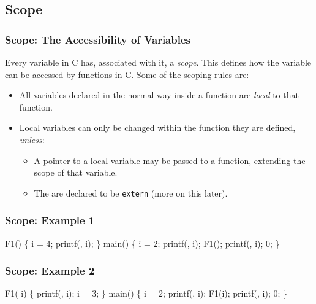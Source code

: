 \documentclass[smaller,table]{beamer} %
\begin{document}
\subsection{Scope}
\begin{frame}
\frametitle{Scope: The Accessibility of Variables}
Every variable in C has, associated with it, a \emph{scope}. This defines how the variable can be accessed by functions in C. Some of the scoping rules are:
\begin{itemize}
\item All variables declared in the normal way inside a function are \emph{local} to that function.
\item Local variables can only be changed within the function they are defined,
\emph{unless}:
\begin{itemize}
\item A pointer to a local variable may be passed to a function, extending the scope of that variable.
\item The are declared to be {\tt extern} (more on this later).
\end{itemize}
\end{itemize}
\end{frame}

\begin{frame}[fragile]
\frametitle{Scope: Example 1}
\vspace{-0.1in}
\begin{semiverbatim}
\kr\kl{} 
\kl
\kl{} F1()
\kl\{
\kl   {} i = 4;
\kl   printf(, i);
\kl\}
\kl
\kl{} main()
\kl\{
\kl   {} i = 2;
\kl   printf(, i);
\kl   F1();
\kl   printf(, i);
\kl   {} 0;
\kl\}
\end{semiverbatim}
\end{frame}

\begin{frame}[fragile]
\frametitle{Scope: Example 2}
\vspace{-0.1in}
\begin{semiverbatim}
\kr\kl{} 
\kl
\kl{} F1( i)
\kl\{
\kl   printf(, i);
\kl   i = 3;  
\kl\}
\kl
\kl{} main()
\kl\{
\kl   {} i = 2;
\kl   printf(, i);
\kl   F1(i);
\kl   printf(, i);
\kl   {} 0;
\kl\}
\end{semiverbatim}
\end{frame}
\end{document}
